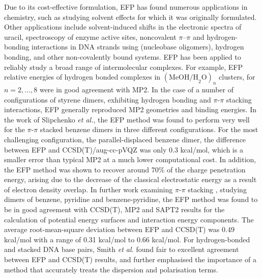 Due to its cost-effective formulation, EFP has found numerous applications in chemistry, such as studying solvent effects for which it was originally formulated.
\cite{Chen1996a, Day1996a, Day1997a, Krauss1997a, Merrill1998a, Day2000a, Adamovic2006a}
Other applications include solvent-induced shifts in the electronic spectra of uracil,
\cite{DeFusco2011a}
spectroscopy of enzyme active sites,
\cite{Krauss1995a, Krauss1998a}
noncovalent $\pi$--$\pi$ and hydrogen-bonding interactions in DNA strands using (nucleobase oligomers),
\cite{Ghosh2010a}
hydrogen bonding,
\cite{Jensen1994a}
and other non-covalently bound systems.
\cite{Gordon2009a, Gordon2013a, Wladkowski1995a}
EFP has been applied to reliably study a broad range of intermolecular complexes. For example, EFP relative energies of hydrogen bonded complexes in $ (\text{MeOH/H}_2\text{O})_{n} $ clusters, for $ n = 2, \ldots, 8 $ were in good agreement with MP2.
\cite{Adamovic2006a}
In the case of a number of configurations of styrene dimers, exhibiting hydrogen bonding and  $\pi$-$\pi$ stacking interactions, EFP generally reproduced MP2 geometries and binding energies.
\cite{Adamovic2006b}
In the work of Slipchenko \emph{et al.}, 
\cite{Slipchenko2007a}
the EFP method was found to perform very well for the $\pi$-$\pi$ stacked benzene dimers in three different configurations.
For the most challenging configuration, the parallel-displaced benzene dimer, the difference between EFP and CCSD(T)/aug-cc-pVQZ was only 0.3 kcal/mol, which is a smaller error than typical MP2 at a much lower computational cost.
In addition, the EFP method was shown to recover around 70\% of the charge penetration energy, arising due to the decrease of the classical electrostatic energy as a result of electron density overlap.
\cite{Slipchenko2007a}
In further work examining $\pi$-$\pi$ stacking
\cite{Smith2008a}, 
studying dimers of benzene, pyridine and benzene-pyridine, the EFP method was found to be in good agreement with CCSD(T), MP2 and SAPT2 results for the calculation of potential energy surfaces and interaction energy components.
The average root-mean-square deviation between EFP and CCSD(T) was 0.49 kcal/mol with a range of 0.31 kcal/mol to 0.66 kcal/mol.
\cite{Smith2011a,Slipchenko2009a}
For hydrogen-bonded and stacked DNA base pairs, Smith \emph{et al.} found fair to excellent agreement between EFP and CCSD(T) results, 
\cite{Smith2011b}
and further emphasised the importance of a method that accurately treats the dispersion and polarisation terms.

